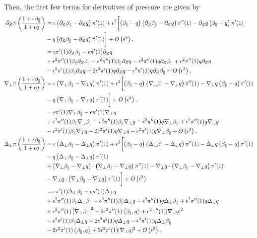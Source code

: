 \documentclass{article}
\newcommand{\para}{\parallel}
\newcommand{\ep}{\epsilon}
\newcommand{\np}{\nabla_\perp}
\newcommand{\lap}{\Delta_\perp}
\newcommand{\p}{\partial}
\newcommand{\frinv}{\frac{1+\ep\beta_\para}{1+\ep q}}
\newcommand{\pth} [1] {\left( #1 \right) }
\begin{document}
Then, the first few terms for derivatives of pressure are given by 
\begin{align*}
    \p_Z\pi\pth{\frinv} &= \ep\pth{\p_Z \beta_\para-\p_Zq}\pi'(1) +  \ep^2 \biggl[ \pth{\beta_\para-q} \pth{\p_Z \beta_\para-\p_Zq}\pi''(1) - \p_Zq\pth{\beta_\para-q}\pi'(1) \\ 
    & - q\pth{\p_Z \beta_\para-\p_Zq}\pi'(1) \biggr] + O\pth{\ep^3}, \\ 
        &= \ep \pi'(1) \p_Z \beta_\para - \ep \pi'(1) \p_Zq \\ 
        &+ \ep^2 \pi''(1) \beta_\para \p_Z \beta_\para - \ep^2 \pi''(1) \beta_\para\p_Zq - \ep^2 \pi''(1) q\p_Z\beta_\para + \ep^2 \pi''(1) q\p_Z q \\ 
        &- \ep^2 \pi'(1) \beta_\para \p_Zq + 2 \ep^2 \pi'(1) q \p_Z q  - \ep^2 \pi'(1) q \p_Z \beta_\para + O\pth{\ep^3}, \\ 
    \np\pi\pth{\frinv} &= \ep\pth{\np \beta_\para-\np q}\pi'(1) + \ep^2 \biggl[ \pth{\beta_\para-q} \pth{\np \beta_\para-\np q} \pi''(1) - \np q\pth{\beta_\para-q}\pi'(1) \\ 
    & - q\pth{\np \beta_\para-\np q} \pi'(1) \biggr] + O\pth{\ep^3}, \\ 
        &= \ep\pi'(1) \np\beta_\para - \ep\pi'(1) \np q \\ 
        &+ \ep^2\pi''(1) \beta_\para\np \beta_\para - \ep^2\pi''(1) \beta_\para\np q - \ep^2\pi''(1) q\np\beta_\para + \ep^2\pi''(1) q\np q \\ 
        &- \ep^2\pi'(1) \beta_\para\np q + 2\ep^2\pi'(1) q\np q - \ep^2\pi'(1) q\np\beta_\para + O\pth{\ep^3}, \\ 
    \lap\pi\pth{\frinv} &= \ep\pth{\lap \beta_\para-\lap q}\pi'(1) + \ep^2 \biggl[ \pth{\beta_\para-q} \pth{\lap \beta_\para-\lap q}\pi''(1) - \lap q\pth{\beta_\para-q}\pi'(1) \\ 
    &- q\pth{\lap \beta_\para-\lap q}\pi'(1) \\ 
    &+ \pth{\np \beta_\para-\np q}\cdot \pth{\np \beta_\para-\np q} \pi''(1) - \np q\cdot \pth{\np \beta_\para-\np q} \pi'(1) \\ 
    &-\np q\cdot \pth{\np \beta_\para-\np q} \pi'(1) \biggr] + O\pth{\ep^3} \\ 
        &= \ep\pi'(1) \lap\beta_\para - \ep\pi'(1) \lap q \\ 
        &+ \ep^2\pi''(1) \beta_\para\lap \beta_\para - \ep^2\pi''(1) \beta_\para\lap q - \ep^2\pi''(1) q\lap\beta_\para + \ep^2\pi''(1) q\lap q \\ 
        &+ \ep^2\pi''(1) \left|\np\beta_\para\right|^2 - 2\ep^2\pi''(1) \Braket{\beta_\para,q} + \ep^2\pi''(1) |\np q|^2 \\ 
        &- \ep^2\pi'(1) \beta_\para\lap q + 2\ep^2\pi'(1) q\lap q - \ep^2\pi'(1) q\lap\beta_\para \\ 
        &- 2\ep^2\pi'(1) \Braket{\beta_\para,q} + 2\ep^2\pi'(1) |\np q|^2 + O\pth{\ep^3}, \\ 
\end{align*}
\end{document}
